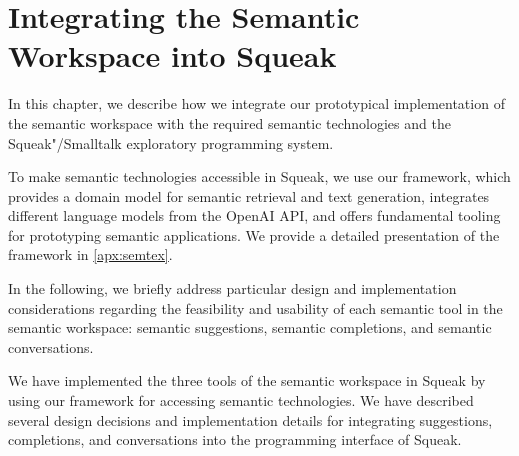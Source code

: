
\chapter{Integrating the Semantic Workspace into Squeak}
\label{cha:implementation}

In this chapter, we describe how we integrate our prototypical implementation of the semantic workspace with the required semantic technologies and the Squeak"/Smalltalk exploratory programming system.

To make semantic technologies accessible in Squeak, we use our \semtex framework, which provides a domain model for semantic retrieval and text generation, integrates different language models from the OpenAI API, and offers fundamental tooling for prototyping semantic applications.
We provide a detailed presentation of the framework in \cref{apx:semtex}.

In the following, we briefly address particular design and implementation considerations regarding the feasibility and usability of each semantic tool in the semantic workspace: semantic suggestions, semantic completions, and semantic conversations.


\begin{summary}
	We have implemented the three tools of the semantic workspace in Squeak by using our \semtex framework for accessing semantic technologies.
	We have described several design decisions and implementation details for integrating suggestions, completions, and conversations into the programming interface of Squeak.
\end{summary}

